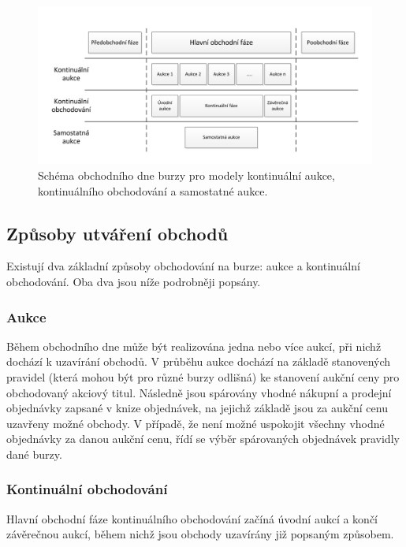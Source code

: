 \documentclass[thesis=M,czech]{FITthesis}[2012/06/26]
\begin{document}
\begin{figure}\centering
	\includegraphics[width=\textwidth]{images/obchodni-den} 
	\caption[Modely obchodního dne]{Schéma obchodního dne burzy pro modely kontinuální aukce, 
			kontinuálního obchodování a samostatné aukce.}\label{fig:obchodni-den}
\end{figure}


\subsection{Způsoby utváření obchodů}

Existují dva základní způsoby obchodování na burze: aukce a kontinuální obchodování. Oba dva jsou níže podrobněji 
popsány. 


\subsubsection{Aukce}

Během obchodního dne může být realizována jedna nebo více aukcí, při nichž dochází k uzavírání obchodů. V průběhu 
aukce dochází na základě stanovených pravidel (která mohou být pro různé burzy odlišná) ke stanovení aukční ceny 
pro obchodovaný akciový titul. Následně jsou spárovány vhodné nákupní a prodejní objednávky zapsané v knize 
objednávek, na jejichž základě jsou za aukční cenu uzavřeny možné obchody. V případě, že není možné uspokojit 
všechny vhodné objednávky za danou aukční cenu, řídí se výběr spárovaných objednávek pravidly dané burzy.



\subsubsection{Kontinuální obchodování}

Hlavní obchodní fáze kontinuálního obchodování začíná úvodní aukcí a končí závěrečnou aukcí, během nichž jsou 
obchody uzavírány již popsaným způsobem. 
\end{document}

